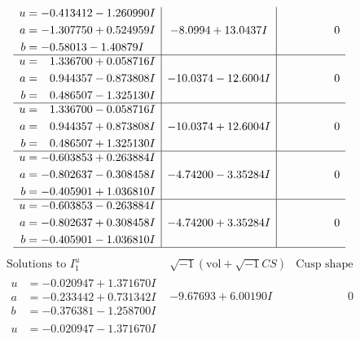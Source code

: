 \documentclass[1p]{elsarticle_modified}
\theoremstyle{definition}
\newcommand{\I}{\sqrt{-1}}
\begin{document}
$$\begin{array}{c|c|c}
\begin{aligned}
u &= -0.413412 - 1.260990 I \\
a &= -1.307750 + 0.524959 I \\
b &= -0.58013 - 1.40879 I\end{aligned}
 & -8.0994 + 13.0437 I & \phantom{-0.000000 } 0 \\ \hline\begin{aligned}
u &= \phantom{-}1.336700 + 0.058716 I \\
a &= \phantom{-}0.944357 - 0.873808 I \\
b &= \phantom{-}0.486507 - 1.325130 I\end{aligned}
 & -10.0374 - 12.6004 I & \phantom{-0.000000 } 0 \\ \hline\begin{aligned}
u &= \phantom{-}1.336700 - 0.058716 I \\
a &= \phantom{-}0.944357 + 0.873808 I \\
b &= \phantom{-}0.486507 + 1.325130 I\end{aligned}
 & -10.0374 + 12.6004 I & \phantom{-0.000000 } 0 \\ \hline\begin{aligned}
u &= -0.603853 + 0.263884 I \\
a &= -0.802637 - 0.308458 I \\
b &= -0.405901 + 1.036810 I\end{aligned}
 & -4.74200 - 3.35284 I & \phantom{-0.000000 } 0 \\ \hline\begin{aligned}
u &= -0.603853 - 0.263884 I \\
a &= -0.802637 + 0.308458 I \\
b &= -0.405901 - 1.036810 I\end{aligned}
 & -4.74200 + 3.35284 I & \phantom{-0.000000 } 0\\
 \hline 
 \end{array}$$\newpage$$\begin{array}{c|c|c}  
\text{Solutions to }I^u_{1}& \I (\text{vol} + \sqrt{-1}CS) & \text{Cusp shape}\\
 \hline 
\begin{aligned}
u &= -0.020947 + 1.371670 I \\
a &= -0.233442 + 0.731342 I \\
b &= -0.376381 - 1.258700 I\end{aligned}
 & -9.67693 + 6.00190 I & \phantom{-0.000000 } 0 \\ \hline\begin{aligned}
u &= -0.020947 - 1.371670 I \\

\end{aligned}
\end{array}$$
\end{document}
